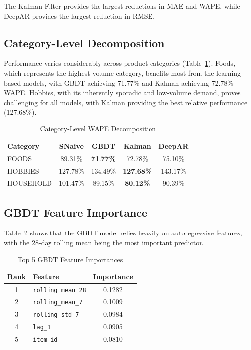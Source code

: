 \documentclass[conference]{IEEEtran}
\begin{document}
The Kalman Filter provides the largest reductions in MAE and WAPE, while DeepAR provides the largest reduction in RMSE.

\subsection{Category-Level Decomposition}

Performance varies considerably across product categories (Table~\ref{tab:category}). Foods, which represents the highest-volume category, benefits most from the learning-based models, with GBDT achieving 71.77\% and Kalman achieving 72.78\% WAPE. Hobbies, with its inherently sporadic and low-volume demand, proves challenging for all models, with Kalman providing the best relative performance (127.68\%).

\begin{table}[htbp]
\centering
\caption{Category-Level WAPE Decomposition}
\label{tab:category}
\begin{tabular}{lcccc}
\toprule
\textbf{Category} & \textbf{SNaive} & \textbf{GBDT} & \textbf{Kalman} & \textbf{DeepAR} \\
\midrule
FOODS     & 89.31\% & \textbf{71.77\%} & 72.78\% & 75.10\% \\
HOBBIES   & 127.78\% & 134.49\% & \textbf{127.68\%} & 143.17\% \\
HOUSEHOLD & 101.47\% & 89.15\% & \textbf{80.12\%} & 90.39\% \\
\bottomrule
\end{tabular}
\end{table}

\subsection{GBDT Feature Importance}

Table~\ref{tab:feature_importance} shows that the GBDT model relies heavily on autoregressive features, with the 28-day rolling mean being the most important predictor.

\begin{table}[htbp]
\centering
\caption{Top 5 GBDT Feature Importances}
\label{tab:feature_importance}
\begin{tabular}{clc}
\toprule
\textbf{Rank} & \textbf{Feature} & \textbf{Importance} \\
\midrule
1 & \texttt{rolling\_mean\_28} & 0.1282 \\
2 & \texttt{rolling\_mean\_7}  & 0.1009 \\
3 & \texttt{rolling\_std\_7}   & 0.0984 \\
4 & \texttt{lag\_1}            & 0.0905 \\
5 & \texttt{item\_id}          & 0.0810 \\
\bottomrule
\end{tabular}
\end{table}
\end{document}
